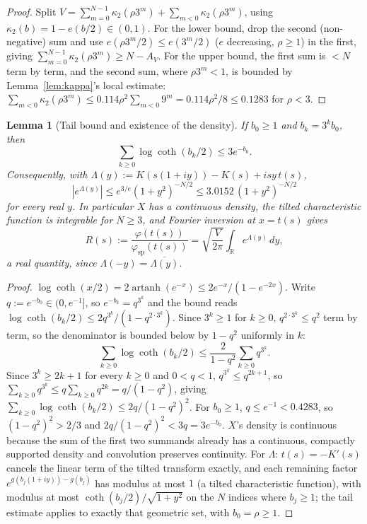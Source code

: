 \documentclass[11pt]{amsart}
\theoremstyle{plain}
\newtheorem{lemma}[theorem]{Lemma}
\theoremstyle{definition}
\theoremstyle{remark}
\DeclareMathOperator{\artanh}{artanh}
\newcommand{\R}{\mathbb{R}}
\begin{document}
\begin{proof}
Split $V = \sum_{m=0}^{N-1}\kappa_2(\rho3^m) + \sum_{m<0}\kappa_2(\rho3^m)$, using $\kappa_2(b) =
1-e(b/2) \in (0,1)$. For the lower bound, drop the second (non-negative) sum and use $e(\rho3^m/2)
\le e(3^m/2)$ ($e$ decreasing, $\rho\ge1$) in the first, giving $\sum_{m=0}^{N-1}\kappa_2(\rho3^m)
\ge N - A_V$. For the upper bound, the first sum is $<N$ term by term, and the second sum, where
$\rho3^m<1$, is bounded by Lemma~\ref{lem:kappa}'s local estimate: $\sum_{m<0}\kappa_2(\rho3^m) \le
0.114\rho^2\sum_{m<0}9^m = 0.114\rho^2/8 \le 0.1283$ for $\rho<3$.
\end{proof}

\begin{lemma}[Tail bound and existence of the density]
\label{lem:tail}
If $b_0\ge1$ and $b_k=3^kb_0$, then
\[
\sum_{k\ge0}\log\coth(b_k/2) \le 3e^{-b_0}.
\]
Consequently, with $\Lambda(y) := K(s(1+iy)) - K(s) + isy\,t(s)$,
\[
|e^{\Lambda(y)}| \le e^{3/e}(1+y^2)^{-N/2} \le 3.0152\,(1+y^2)^{-N/2}
\]
for every real $y$. In particular $X$ has a continuous density, the tilted characteristic function
is integrable for $N\ge3$, and Fourier inversion at $x=t(s)$ gives
\begin{equation}
\label{eq:R}
R(s) := \frac{\varphi(t(s))}{\varphi_{\mathrm{sp}}(t(s))} = \sqrt{\frac{V}{2\pi}}\int_\R e^{\Lambda(y)}\,dy,
\end{equation}
a real quantity, since $\Lambda(-y) = \overline{\Lambda(y)}$.
\end{lemma}

\begin{proof}
$\log\coth(x/2) = 2\artanh(e^{-x}) \le 2e^{-x}/(1-e^{-2x})$. Write $q:=e^{-b_0}\in(0,e^{-1}]$, so
$e^{-b_k}=q^{3^k}$ and the bound reads $\log\coth(b_k/2) \le 2q^{3^k}/(1-q^{2\cdot3^k})$. Since
$3^k\ge1$ for $k\ge0$, $q^{2\cdot3^k}\le q^2$ term by term, so the denominator is bounded below by
$1-q^2$ uniformly in $k$:
\[
\sum_{k\ge0}\log\coth(b_k/2) \le \frac{2}{1-q^2}\sum_{k\ge0}q^{3^k}.
\]
Since $3^k\ge2k+1$ for every $k\ge0$ and $0<q<1$, $q^{3^k}\le q^{2k+1}$, so
$\sum_{k\ge0}q^{3^k} \le q\sum_{k\ge0}q^{2k} = q/(1-q^2)$, giving
$\sum_{k\ge0}\log\coth(b_k/2) \le 2q/(1-q^2)^2$. For $b_0\ge1$, $q\le e^{-1}<0.4283$, so
$(1-q^2)^2>2/3$ and $2q/(1-q^2)^2<3q=3e^{-b_0}$.
$X$'s density is continuous because the sum of the first two summands already has a continuous,
compactly supported density and convolution preserves continuity. For $\Lambda$: $t(s) =
-K'(s)$ cancels the linear term of the tilted transform exactly, and each remaining factor
$e^{g(b_j(1+iy))-g(b_j)}$ has modulus at most $1$ (a tilted characteristic function), with modulus
at most $\coth(b_j/2)/\sqrt{1+y^2}$ on the $N$ indices where $b_j\ge1$; the tail estimate applies to
exactly that geometric set, with $b_0=\rho\ge1$.
\end{proof}
\end{document}
